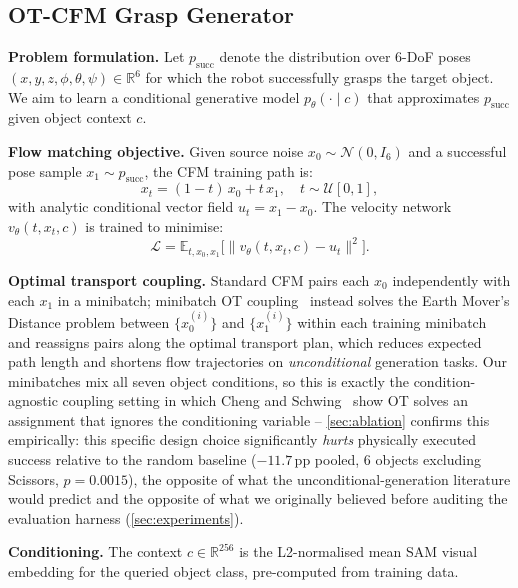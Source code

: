 \documentclass[journal]{IEEEtran}
\begin{document}
\subsection{OT-CFM Grasp Generator}
\label{sec:cfm}

\noindent\textbf{Problem formulation.}
Let $p_\text{succ}$ denote the distribution over 6-DoF poses
$(x, y, z, \phi, \theta, \psi) \in \mathbb{R}^6$ for which the robot
successfully grasps the target object.
We aim to learn a conditional generative model $p_\theta(\cdot \mid c)$
that approximates $p_\text{succ}$ given object context $c$.

\noindent\textbf{Flow matching objective.}
Given source noise $x_0 \sim \mathcal{N}(0, I_6)$ and a successful pose
sample $x_1 \sim p_\text{succ}$, the CFM training path is:
\begin{equation}
  x_t = (1-t)\,x_0 + t\,x_1, \quad t \sim \mathcal{U}[0,1],
  \label{eq:path}
\end{equation}
with analytic conditional vector field $u_t = x_1 - x_0$.
The velocity network $v_\theta(t, x_t, c)$ is trained to minimise:
\begin{equation}
  \mathcal{L} = \mathbb{E}_{t, x_0, x_1} \bigl[\|v_\theta(t, x_t, c) - u_t\|^2\bigr].
  \label{eq:loss}
\end{equation}

\noindent\textbf{Optimal transport coupling.}
Standard CFM pairs each $x_0$ independently with each $x_1$ in a minibatch;
minibatch OT coupling~\cite{tong2023otcfm} instead solves the Earth Mover's
Distance problem between $\{x_0^{(i)}\}$ and $\{x_1^{(i)}\}$ within each
training minibatch and reassigns pairs along the optimal transport plan,
which reduces expected path length and shortens flow trajectories on
\emph{unconditional} generation tasks. Our minibatches mix all seven object
conditions, so this is exactly the condition-agnostic coupling setting in
which Cheng and Schwing~\cite{cheng2025curse} show OT solves an assignment
that ignores the conditioning variable -- \cref{sec:ablation} confirms this
empirically: this
specific design choice significantly \emph{hurts} physically executed
success relative to the random baseline ($-11.7$\,pp pooled, 6 objects
excluding Scissors, $p{=}0.0015$), the opposite of what the unconditional-generation literature
would predict and the opposite of what we originally believed before
auditing the evaluation harness (\cref{sec:experiments}).

\noindent\textbf{Conditioning.}
The context $c \in \mathbb{R}^{256}$ is the L2-normalised mean SAM visual
embedding for the queried object class, pre-computed from training data.
\end{document}
